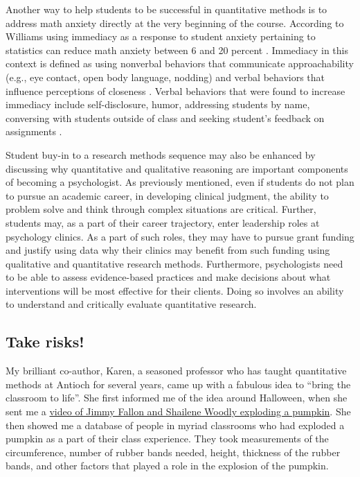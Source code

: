 \documentclass[
  11pt,
]{book}
\begin{document}
Another way to help students to be successful in quantitative methods is to address math anxiety directly at the very beginning of the course. According to Williams \citeyearpar{williams_statistics_2010} using immediacy as a response to student anxiety pertaining to statistics can reduce math anxiety between 6 and 20 percent \citep{williams_statistics_2010}. Immediacy in this context is defined as using nonverbal behaviors that communicate approachability (e.g., eye contact, open body language, nodding) and verbal behaviors that influence perceptions of closeness \citep{anderson_impact_1981, williams_statistics_2010}. Verbal behaviors that were found to increase immediacy include self-disclosure, humor, addressing students by name, conversing with students outside of class and seeking student's feedback on assignments \citep{gorham_relationship_1988, williams_statistics_2010}.

Student buy-in to a research methods sequence may also be enhanced by discussing why quantitative and qualitative reasoning are important components of becoming a psychologist. As previously mentioned, even if students do not plan to pursue an academic career, in developing clinical judgment, the ability to problem solve and think through complex situations are critical. Further, students may, as a part of their career trajectory, enter leadership roles at psychology clinics. As a part of such roles, they may have to pursue grant funding and justify using data why their clinics may benefit from such funding using qualitative and quantitative research methods. Furthermore, psychologists need to be able to assess evidence-based practices and make decisions about what interventions will be most effective for their clients. Doing so involves an ability to understand and critically evaluate quantitative research.

\subsection{Take risks!}\label{take-risks}

My brilliant co-author, Karen, a seasoned professor who has taught quantitative methods at Antioch for several years, came up with a fabulous idea to ``bring the classroom to life''. She first informed me of the idea around Halloween, when she sent me a \href{https://www.youtube.com/watch?v=TCW1AZh_-5o}{video of Jimmy Fallon and Shailene Woodly exploding a pumpkin}. She then showed me a database of people in myriad classrooms who had exploded a pumpkin as a part of their class experience. They took measurements of the circumference, number of rubber bands needed, height, thickness of the rubber bands, and other factors that played a role in the explosion of the pumpkin.
\end{document}
